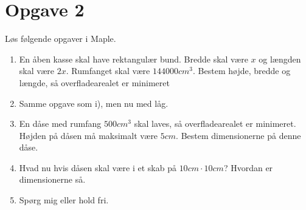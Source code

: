 \section*{Opgave 2}
Løs følgende opgaver i Maple.
\begin{enumerate}[label=\roman*)]
\item En åben kasse skal have rektangulær bund. Bredde skal være $x$ og længden skal være $2x$. Rumfanget skal være $144000cm^3$. Bestem højde, bredde og længde, så overfladearealet er minimeret
\item Samme opgave som i), men nu med låg.
\item En dåse med rumfang $500cm^3$ skal laves, så overfladearealet er minimeret. Højden på dåsen må maksimalt være $5cm$. Bestem dimensionerne på denne dåse.
\item Hvad nu hvis dåsen skal være i et skab på $10cm\cdot 10cm$? Hvordan er dimensionerne så.
\item Spørg mig eller hold fri.

\end{enumerate}